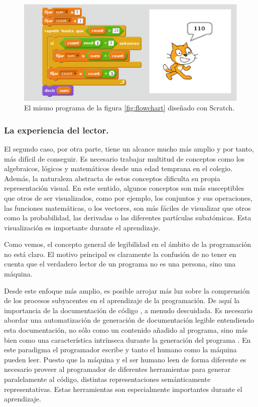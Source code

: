\documentclass{llncs}
\begin{document}
\begin{figure}[ht]
\begin{center}
\includegraphics[scale=0.4]{images/scratch.eps}
\caption{El mismo programa de la figura \ref{fig:flowchart} diseñado con Scratch. 
\label{fig:scratch}}
\end{center}
\end{figure}


\subsubsection{La experiencia del lector.}
\label{subsec:reader}

El segundo caso, por otra parte, tiene un alcance mucho más amplio y por tanto, más difícil de conseguir. Es necesario trabajar multitud de conceptos como los algebraicos, lógicos y matemáticos desde una edad temprana en el colegio. Además, la naturaleza abstracta de estos conceptos dificulta su propia representación visual. En este sentido, algunos conceptos son más susceptibles que otros de ser visualizados, como por ejemplo, los conjuntos y sus operaciones, las funciones matemáticas, o los vectores, son más fáciles de visualizar que otros como la probabilidad, las derivadas o las diferentes partículas subatómicas. Esta visualización es importante durante el aprendizaje.

Como vemos, el concepto general de legibilidad en el ámbito de la programación no está claro. El motivo principal es claramente la confusión de no tener en cuenta que el verdadero lector de un programa no es una persona, sino una máquina. 

Desde este enfoque más amplio, es posible arrojar más luz sobre la comprensión de los procesos subyacentes en el aprendizaje de la programación. De aquí la importancia de la documentación de código \cite{tenny1988program}, a menudo descuidada. Es necesario abordar una automatización de generación de documentación legible entendiendo esta documentación, no sólo como un contenido añadido al programa, sino más bien como una característica intrínseca durante la generación del programa \cite{baecker1988enhancing}. En este paradigma el programador escribe y tanto el humano como la máquina pueden leer. Puesto que la máquina y el ser humano leen de forma diferente es necesario proveer al programador de diferentes herramientas para generar paralelamente al código, distintas representaciones semánticamente representativas. Estas herramientas son especialmente importantes durante el aprendizaje.
\end{document}
